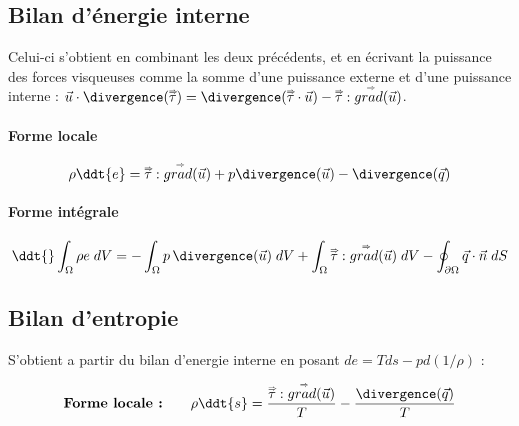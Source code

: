 \subsection{Bilan d'énergie interne}
Celui-ci s'obtient en combinant les deux précédents, et en écrivant la puissance des forces 
visqueuses comme la somme d'une puissance externe et d'une puissance interne :
$ \vec{u} \cdot \divergence ( \mytensor{\tau} ) =  \divergence ( \mytensor{\tau} \cdot \vec{u} ) -  \mytensor{\tau} : \mytensor{grad}(\vec{u})$. 


\paragraph{Forme locale}

\begin{equation}
		\rho \ddt{e} 
		= \mytensor{\tau} : \mytensor{grad}(\vec{u}) + 
		p \divergence( \vec{u})
		 - \divergence(\vec{q})
\end{equation}


\paragraph{Forme intégrale}
	\begin{equation}
		\ddt{} \int_{\Omega} \rho e \; dV 
		= 
		- \int_{\Omega} p \, \divergence (\vec{u}) \; dV 
		+ \int_{\Omega} \mytensor{\tau} : \mytensor{grad}(\vec{u})  \; dV
		- \oint_{\partial \Omega} \vec{q} \cdot \vec{n} \; dS
		\label{eq:bilan_global_eulerien_e}
	\end{equation}


\subsection{Bilan d'entropie}

S'obtient a partir du bilan d'energie interne en posant $de = Tds - p d (1/\rho)$ :



\begin{equation}
\mbox{\bf Forme locale :} \qquad
		\rho \ddt{s} 
		=
		\frac{\mytensor{\tau} : \mytensor{grad}(\vec{u})}{T}
		 - \frac{\divergence(\vec{q})}{T}
\end{equation}

